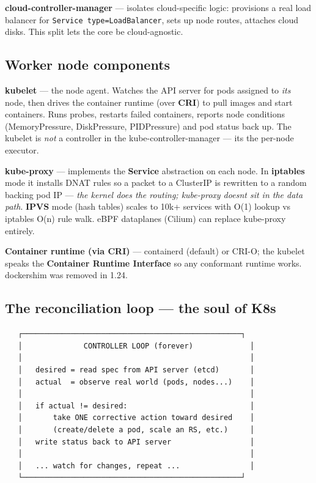 \documentclass[11pt]{article}
\begin{document}
\textbf{cloud-controller-manager} --- isolates cloud-specific logic: provisions a real load balancer for \texttt{Service\ type=LoadBalancer}, sets up node routes, attaches cloud disks. This split lets the core be cloud-agnostic.

\subsection{Worker node components}\label{worker-node-components}

\textbf{kubelet} --- the node agent. Watches the API server for pods assigned to \emph{its} node, then drives the container runtime (over \textbf{CRI}) to pull images and start containers. Runs probes, restarts failed containers, reports node conditions (MemoryPressure, DiskPressure, PIDPressure) and pod status back up. The kubelet is \emph{not} a controller in the kube-controller-manager --- it\textquotesingle s the per-node executor.

\textbf{kube-proxy} --- implements the \textbf{Service} abstraction on each node. In \textbf{iptables} mode it installs DNAT rules so a packet to a ClusterIP is rewritten to a random backing pod IP --- \emph{the kernel does the routing; kube-proxy doesn\textquotesingle t sit in the data path}. \textbf{IPVS} mode (hash tables) scales to 10k+ services with O(1) lookup vs iptables\textquotesingle{} O(n) rule walk. eBPF dataplanes (Cilium) can replace kube-proxy entirely.

\textbf{Container runtime (via CRI)} --- containerd (default) or CRI-O; the kubelet speaks the \textbf{Container Runtime Interface} so any conformant runtime works. dockershim was removed in 1.24.

\subsection{The reconciliation loop --- the soul of K8s}\label{the-reconciliation-loop--the-soul-of-k8s}

\setcodelang{}

\begin{verbatim}
   ┌──────────────────────────────────────────────────┐
   │              CONTROLLER LOOP (forever)             │
   │                                                    │
   │   desired = read spec from API server (etcd)       │
   │   actual  = observe real world (pods, nodes...)    │
   │                                                    │
   │   if actual != desired:                            │
   │       take ONE corrective action toward desired    │
   │       (create/delete a pod, scale an RS, etc.)     │
   │   write status back to API server                  │
   │                                                    │
   │   ... watch for changes, repeat ...                │
   └──────────────────────────────────────────────────┘
\end{verbatim}
\end{document}
